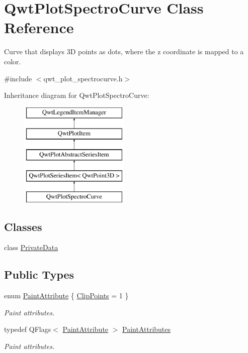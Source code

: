 \hypertarget{class_qwt_plot_spectro_curve}{\section{Qwt\-Plot\-Spectro\-Curve Class Reference}
\label{class_qwt_plot_spectro_curve}
}


Curve that displays 3\-D points as dots, where the z coordinate is mapped to a color.  




{\ttfamily \#include $<$qwt\-\_\-plot\-\_\-spectrocurve.\-h$>$}

Inheritance diagram for Qwt\-Plot\-Spectro\-Curve\-:\begin{figure}[H]
\begin{center}
\leavevmode
\includegraphics[height=5.000000cm]{class_qwt_plot_spectro_curve}
\end{center}
\end{figure}
\subsection*{Classes}
\begin{DoxyCompactItemize}
\item 
class \hyperlink{class_qwt_plot_spectro_curve_1_1_private_data}{Private\-Data}
\end{DoxyCompactItemize}
\subsection*{Public Types}
\begin{DoxyCompactItemize}
\item 
enum \hyperlink{class_qwt_plot_spectro_curve_af6d4c6ae392f3f521db710484a059625}{Paint\-Attribute} \{ \hyperlink{class_qwt_plot_spectro_curve_af6d4c6ae392f3f521db710484a059625ab8586d2301ec1e0888f852bca84c2501}{Clip\-Points} = 1
 \}
\begin{DoxyCompactList}\small\item\em Paint attributes. \end{DoxyCompactList}\item 
typedef Q\-Flags$<$ \hyperlink{class_qwt_plot_spectro_curve_af6d4c6ae392f3f521db710484a059625}{Paint\-Attribute} $>$ \hyperlink{class_qwt_plot_spectro_curve_a78b3bf4c7d055f2f00bd371e9ddc4f2f}{Paint\-Attributes}
\begin{DoxyCompactList}\small\item\em Paint attributes. \end{DoxyCompactList}\end{DoxyCompactItemize}
